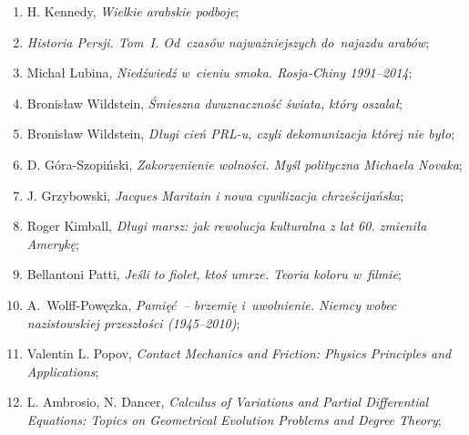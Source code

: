 \documentclass[a4paper,11pt]{article}
\begin{document}
\begin{enumerate}
\item H. Kennedy, \textit{Wielkie arabskie podboje};



\item \textit{Historia Persji. Tom~I. Od~czasów najważniejszych
    do~najazdu arabów};



\item Michał Lubina, \textit{Niedźwiedź w~cieniu smoka. Rosja-Chiny
    1991--2014};



\item Bronisław Wildstein, \textit{Śmieszna dwuznaczność świata, który
    oszalał};



\item Bronisław Wildstein, \textit{Długi cień PRL-u, czyli dekomunizacja
    której nie było};



\item D. Góra-Szopiński, \textit{Zakorzenienie wolności. Myśl polityczna
    Michaela Novaka};



\item J. Grzybowski, \textit{Jacques Maritain i nowa cywilizacja
    chrześcijańska};



\item Roger Kimball, \textit{Długi marsz: jak rewolucja kulturalna z lat
    60. zmieniła Amerykę};



\item Bellantoni Patti, \textit{Jeśli to fiolet, ktoś umrze. Teoria
    koloru w~filmie};



\item A.~Wolff-Powęzka, \textit{Pamięć~-- brzemię i~uwolnienie. Niemcy
    wobec nazistowskiej przeszłości (1945--2010)};



\item Valentin L. Popov, \textit{Contact Mechanics and Friction: Physics
    Principles and Applications};



\item L. Ambrosio, N. Dancer, \textit{Calculus of Variations and Partial
    Differential Equations: Topics on Geometrical Evolution Problems
    and Degree Theory};




\end{enumerate}
\end{document}
